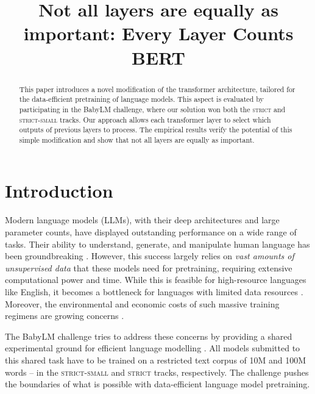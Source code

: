 \title{Not all layers are equally as important: Every Layer Counts BERT}



\maketitle

\begin{abstract}
This paper introduces a novel modification of the transformer architecture, tailored for the data-efficient pretraining of language models. This aspect is evaluated by participating in the BabyLM challenge, where our solution won both the \textsc{strict} and \textsc{strict-small} tracks. Our approach allows each transformer layer to select which outputs of previous layers to process. The empirical results verify the potential of this simple modification and show that not all layers are equally as important.

\end{abstract}

\section{Introduction}

Modern language models (LLMs), with their deep architectures and large parameter counts, have displayed outstanding performance on a wide range of tasks. Their ability to understand, generate, and manipulate human language has been groundbreaking \citep{devlin-etal-2019-bert, 2020t5, NEURIPS2020_1457c0d6}. However, this success largely relies on \textit{vast amounts of unsupervised data} that these models need for pretraining, requiring extensive computational power and time. While this is feasible for high-resource languages like English, it becomes a bottleneck for languages with limited data resources \citep{joshi-etal-2020-state}. Moreover, the environmental and economic costs of such massive training regimens are growing concerns \citep{strubell-etal-2019-energy, thompson2020computational}. 

The BabyLM challenge tries to address these concerns by providing a shared experimental ground for efficient language modelling \citep{warstadt-et-al-2023-babylm}. All models submitted to this shared task have to be trained on a restricted text corpus of 10M and 100M words -- in the \textsc{strict-small} and \textsc{strict} tracks, respectively. The challenge pushes the boundaries of what is possible with data-efficient language model pretraining.


